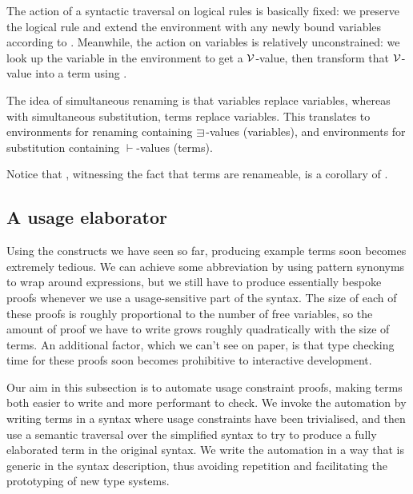 
The action of a syntactic traversal on logical rules is basically fixed: we
preserve the logical rule and extend the environment with any newly bound
variables according to .
Meanwhile, the action on variables is relatively unconstrained: we look up the
variable in the environment to get a $\mathcal V$-value, then transform that $\mathcal V$-value
into a term using .

The idea of simultaneous renaming is that variables replace variables, whereas
with simultaneous substitution, terms replace variables.
This translates to environments for renaming containing $\sqni$-values
(variables), and environments for substitution containing $\vdash$-values
(terms).



Notice that , witnessing the fact
that terms are renameable, is a corollary of .


\subsection{A usage elaborator}\label{sec:usage-elaborator}

Using the constructs we have seen so far, producing example terms soon becomes
extremely tedious.
We can achieve some abbreviation by using pattern synonyms to wrap around
 expressions, but we still have to
produce essentially bespoke proofs whenever we use a usage-sensitive part of the
syntax.
The size of each of these proofs is roughly proportional to the number of free
variables, so the amount of proof we have to write grows roughly quadratically
with the size of terms.
An additional factor, which we can't see on paper, is that type checking time
for these proofs soon becomes prohibitive to interactive development.

Our aim in this subsection is to automate usage constraint proofs, making terms
both easier to write and more performant to check.
We invoke the automation by writing terms in a syntax where usage constraints
have been trivialised, and then use a semantic traversal over the simplified
syntax to try to produce a fully elaborated term in the original syntax.
We write the automation in a way that is generic in the syntax description, thus
avoiding repetition and facilitating the prototyping of new type systems.


